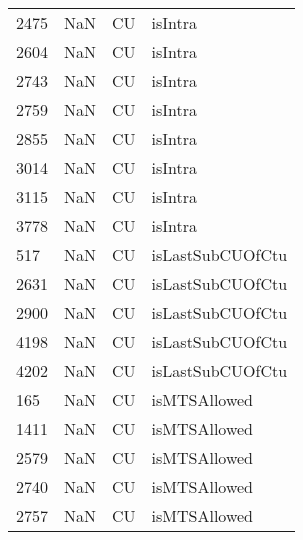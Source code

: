\begin{tabular}{llll}
2475 &                   NaN &                         CU &                                   isIntra \\
2604 &                   NaN &                         CU &                                   isIntra \\
2743 &                   NaN &                         CU &                                   isIntra \\
2759 &                   NaN &                         CU &                                   isIntra \\
2855 &                   NaN &                         CU &                                   isIntra \\
3014 &                   NaN &                         CU &                                   isIntra \\
3115 &                   NaN &                         CU &                                   isIntra \\
3778 &                   NaN &                         CU &                                   isIntra \\
517  &                   NaN &                         CU &                          isLastSubCUOfCtu \\
2631 &                   NaN &                         CU &                          isLastSubCUOfCtu \\
2900 &                   NaN &                         CU &                          isLastSubCUOfCtu \\
4198 &                   NaN &                         CU &                          isLastSubCUOfCtu \\
4202 &                   NaN &                         CU &                          isLastSubCUOfCtu \\
165  &                   NaN &                         CU &                              isMTSAllowed \\
1411 &                   NaN &                         CU &                              isMTSAllowed \\
2579 &                   NaN &                         CU &                              isMTSAllowed \\
2740 &                   NaN &                         CU &                              isMTSAllowed \\
2757 &                   NaN &                         CU &                              isMTSAllowed \\

\end{tabular}
